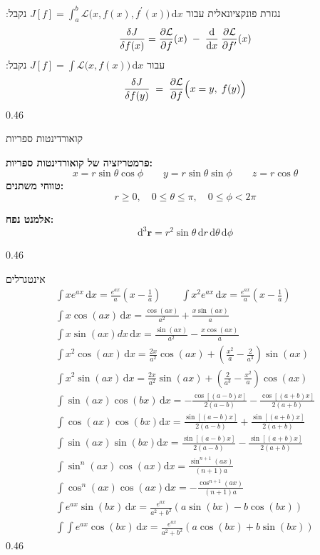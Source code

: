     \begin{mytikzbox}{נגזרת פונקציונאלית}{
        עבור $J[f]=\int_{a}^{b}\mathcal{L}{\big(}x,f(x),f^{\prime}(x){\big)}\,\mathrm{d}x$ נקבל:
$$\frac{\delta J}{\delta f(x)}=\frac{\partial{\cal L}}{\partial f}(x)\;-\;\frac{\mathrm{d}}{\mathrm{d}x}\:\frac{\partial{\cal L}}{\partial f^{\prime}}(x)$$
עבור $J[f]=\int\!\mathcal{L}\bigl(x,f(x)\bigr)\,\mathrm{d}x$ נקבל:
$$\frac{\delta J}{\delta f(y)}\;=\;\frac{\partial{\cal L}}{\partial f}\Big(x=y,\;f(y)\Big)$$ 
   }{0.46}
    \end{mytikzbox}
    \begin{mytikzbox}{קואורדינטות ספריות}{
    \textbf{פרמטריזציה של קואורדינטות ספריות:}
$$
    x = r \sin\theta \cos\phi \qquad
    y = r \sin\theta \sin\phi \qquad
    z = r \cos\theta $$ 
    \textbf{טווחי משתנים:}
    \[
    r \geq 0,\quad 0 \leq \theta \leq \pi,\quad 0 \leq \phi < 2\pi
    \]

    \textbf{אלמנט נפח:}
    \[
    \mathrm{d}^3\mathbf{r} = r^2 \sin\theta\, \mathrm{d}r\, \mathrm{d}\theta\, \mathrm{d}\phi
    \]
    }{0.46}
    \end{mytikzbox}
    \begin{mytikzbox}{אינטגרלים}{
    \vspace{-6pt}
\begin{gather*}
\int  xe^{ax} \, \mathrm{d}x=\frac{e^{ax}}{a}\left( x-\frac{1}{a} \right) \qquad \int x^2e^{ax} \, \mathrm{d}x =\frac{e^{ax}}{a}\left( x-\frac{1}{a} \right) \\
\int x\cos(ax) \, \mathrm{d}x = \frac{\cos(ax)}{a^2}+\frac{x\sin(ax)}{a} \\
\int x \sin(ax)dx  \, \mathrm{d}x= \frac{\sin(ax)}{a^2}-\frac{x\cos(ax)}{a}  \\
\int x^2\cos(ax) \, \mathrm{d}x = \frac{2x}{a^2} \cos(ax)+\left( \frac{x^2}{a} -\frac{2}{a^3} \right)\sin(ax) \\
\int x^2 \sin (ax) \, \mathrm{d}x = \frac{2x}{a^2}\sin(ax)+\left( \frac{2}{a^3}-\frac{x^2}{a} \right)\cos(ax) \\
\int \sin(ax)\cos(bx) \, \mathrm{d}x = - \frac{\cos[(a-b)x]}{2(a-b)}-\frac{\cos[(a+b)x]}{2(a+b)} \\
\int \cos(ax)\cos(bx) \mathrm{d}x = \frac{\sin[(a-b)x]}{2(a-b)} + \frac{\sin[(a+b)x]}{2(a+b)}\\
\int \sin(ax)\sin(bx) \mathrm{d}x = \frac{\sin[(a-b)x]}{2(a-b)} - \frac{\sin[(a+b)x]}{2(a+b)}\\
\int \sin^n(ax)\cos(ax) \mathrm{d}x = \frac{\sin^{n+1}(ax)}{(n+1)a}\\
\int \cos^n(ax)\cos(ax) \mathrm{d}x = -\frac{\cos^{n+1}(ax)}{(n+1)a}\\
 \int \displaystyle e^{ax}\sin (bx)\,\mathrm{d}x=\frac{e^{ax}}{a^2+b^2}(a\sin (bx)−b\cos (bx))\\\int \displaystyle ∫e^{ax}\cos (bx)\,\mathrm{d}x=\frac{e^{ax}}{a^2+b^2}(a\cos (bx)+b\sin (bx))
\end{gather*}
\vspace{-13pt}
}{0.46}
    \end{mytikzbox}
